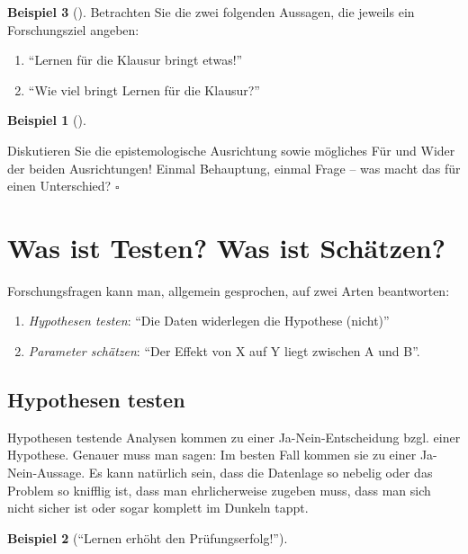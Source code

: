 \documentclass[
  ngerman,
  letterpaper,
  twoside,
  open=any]{scrbook}
\providecommand{\tightlist}{%
  \setlength{\itemsep}{0pt}\setlength{\parskip}{0pt}}\usepackage{longtable,booktabs,array}
\theoremstyle{definition}
\newtheorem{example}{Beispiel}[chapter]
\theoremstyle{plain}
\theoremstyle{definition}
\theoremstyle{definition}
\theoremstyle{remark}
\begin{document}
\begin{example}[]
Betrachten Sie die zwei folgenden Aussagen, die jeweils ein
Forschungsziel angeben:

\begin{enumerate}
\def\labelenumi{\arabic{enumi}.}
\tightlist
\item
  \enquote{Lernen für die Klausur bringt etwas!}
\item
  \enquote{Wie viel bringt Lernen für die Klausur?}
\end{enumerate}

\begin{example}[]\protect\hypertarget{exm-schaetzen-testen}{}\label{exm-schaetzen-testen}

Diskutieren Sie die epistemologische Ausrichtung sowie mögliches Für und
Wider der beiden Ausrichtungen! Einmal Behauptung, einmal Frage -- was
macht das für einen Unterschied? \(\square\)

\end{example}

\section{Was ist Testen? Was ist
Schätzen?}\label{was-ist-testen-was-ist-schuxe4tzen}

Forschungsfragen kann man, allgemein gesprochen, auf zwei Arten
beantworten:

\begin{enumerate}
\def\labelenumi{\arabic{enumi}.}
\tightlist
\item
  \emph{Hypothesen testen}: \enquote{Die Daten widerlegen die Hypothese
  (nicht)}
\item
  \emph{Parameter schätzen}: \enquote{Der Effekt von X auf Y liegt
  zwischen A und B}.
\end{enumerate}

\subsection{Hypothesen testen}\label{hypothesen-testen}

Hypothesen testende Analysen kommen zu einer Ja-Nein-Entscheidung bzgl.
einer Hypothese. Genauer muss man sagen: Im besten Fall kommen sie zu
einer Ja-Nein-Aussage. Es kann natürlich sein, dass die Datenlage so
nebelig oder das Problem so knifflig ist, dass man ehrlicherweise
zugeben muss, dass man sich nicht sicher ist oder sogar komplett im
Dunkeln tappt.

\begin{example}[\enquote{Lernen erhöht den
Prüfungserfolg!}]\protect\hypertarget{exm-lernen-hyp}{}\label{exm-lernen-hyp}


\end{example}
\end{example}
\end{document}

